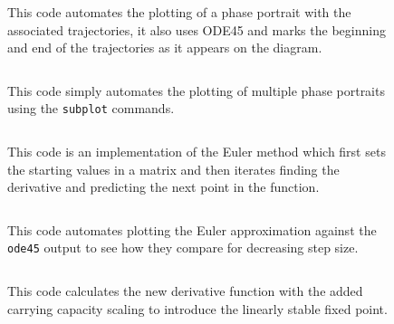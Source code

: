 \documentclass[11pt]{report}
\begin{document}
\begin{appendices}
		\begin{figure}[h]
			\begin{framed}
				\begin{center}
					\inputminted[]{matlab}{../phase_portrait_trajectories.m}
				\end{center}
			\end{framed}
			\caption{This code automates the plotting of a phase portrait with the associated trajectories, it also uses ODE45 and marks the beginning and end of the trajectories as it appears on the diagram.}
			\label{fig:phase_portrait_trajectories_code}
		\end{figure}
		
		\begin{figure}[h]
			\begin{framed}
				\begin{center}
					\inputminted[]{matlab}{../generate_phase_plots.m}
				\end{center}
			\end{framed}
			\caption{This code simply automates the plotting of multiple phase portraits using the \texttt{subplot} commands.}
			\label{fig:multi_phase_portrait_plotting_code}
		\end{figure}
		
		\begin{figure}[h]
			\begin{framed}
				\begin{center}
					\inputminted[]{matlab}{../euler_method.m}
				\end{center}
			\end{framed}
			\caption{This code is an implementation of the Euler method which first sets the starting values in a matrix and then iterates finding the derivative and predicting the next point in the function.}
			\label{fig:euler_method_code}
		\end{figure}
		
		\begin{figure}[h]
			\begin{framed}
				\begin{center}
					\inputminted[]{matlab}{../compare_euler_ode45.m}
				\end{center}
			\end{framed}
			\caption{This code automates plotting the Euler approximation against the \texttt{ode45} output to see how they compare for decreasing step size.}
			\label{fig:euler_ode45_compare_code}
		\end{figure}
		
		\begin{figure}[h]
			\begin{framed}
				\begin{center}
					\inputminted[]{matlab}{../new_lvderivs.m}
				\end{center}
			\end{framed}
			\caption{This code calculates the new derivative function with the added carrying capacity scaling to introduce the linearly stable fixed point.}
			\label{fig:new_lvderivs_code}
		\end{figure}
		
		
	\end{appendices}
\end{document}
